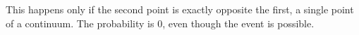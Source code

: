 This happens only if the second point is exactly opposite the first, a single point of a continuum. The probability is $\boxed{0}$, even though the event is possible.
